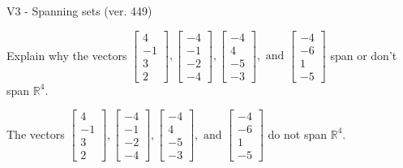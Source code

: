 \begin{exercise}
  \begin{exerciseTitle}V3 - Spanning sets (ver. 449)\end{exerciseTitle}
  \begin{exerciseStatement}
    Explain why the vectors \(\left[\begin{array}{r}
4 \\
-1 \\
3 \\
2
\end{array}\right] , \left[\begin{array}{r}
-4 \\
-1 \\
-2 \\
-4
\end{array}\right] , \left[\begin{array}{r}
-4 \\
4 \\
-5 \\
-3
\end{array}\right] , \text{ and } \left[\begin{array}{r}
-4 \\
-6 \\
1 \\
-5
\end{array}\right]\) span or don't span \(\mathbb{R}^4\). 
	


  \end{exerciseStatement}
  \begin{exerciseAnswer}
   The vectors \(\left[\begin{array}{r}
4 \\
-1 \\
3 \\
2
\end{array}\right] , \left[\begin{array}{r}
-4 \\
-1 \\
-2 \\
-4
\end{array}\right] , \left[\begin{array}{r}
-4 \\
4 \\
-5 \\
-3
\end{array}\right] , \text{ and } \left[\begin{array}{r}
-4 \\
-6 \\
1 \\
-5
\end{array}\right]\) 
  	 do not  
	span \(\mathbb{R}^4\).
  


  \end{exerciseAnswer}
\end{exercise}